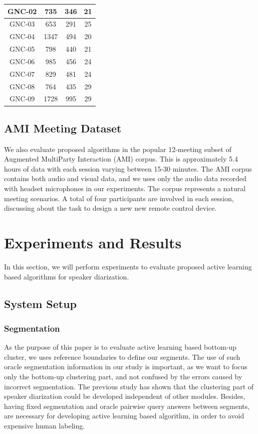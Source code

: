 \documentclass[journal]{IEEEtran}
\begin{document}
\begin{table}[t]
\begin{tabular}{|c|c|c|c|}
GNC-02       & 735              & 346             & 21           \\ \hline
GNC-03       & 653              & 291             & 25           \\ \hline
GNC-04       & 1347             & 494             & 20           \\ \hline
GNC-05       & 798              & 440             & 21           \\ \hline
GNC-06       & 985              & 456             & 24           \\ \hline
GNC-07       & 829              & 481             & 24           \\ \hline
GNC-08       & 764              & 435             & 29           \\ \hline
GNC-09       & 1728             & 995             & 29           \\ \hline
\end{tabular}
\end{table}

\subsection{AMI Meeting Dataset}
We also evaluate proposed algorithms in the popular 12-meeting subset of Augmented MultiParty Interaction (AMI) corpus. This is approximately 5.4 hours of data with each session varying between 15-30 minutes. The AMI corpus contains both audio and visual data, and we uses only the audio data recorded with headset microphones in our experiments. The corpus represents a natural meeting scenarios. A total of four participants are involved in each session, discussing about the task to design a new new remote control device.  

\section{Experiments and Results}
In this section, we will perform experiments to evaluate proposed active learning based algorithms for speaker diarization. 
\subsection{System Setup}
\subsubsection{Segmentation}
As the purpose of this paper is to evaluate active learning based bottom-up cluster, we uses reference boundaries to define our segments. The use of such oracle segmentation information in our study is important, as we want to focus only the bottom-up clustering part, and not confused by the errors caused by incorrect segmentation. The previous study has shown that the clustering part of speaker diarization could be developed independent of other modules. Besides, having fixed segmentation and oracle pairwise query answers between segments, are necessary for developing active learning based algorithm, in order to avoid expensive human labeling.
\end{document}

